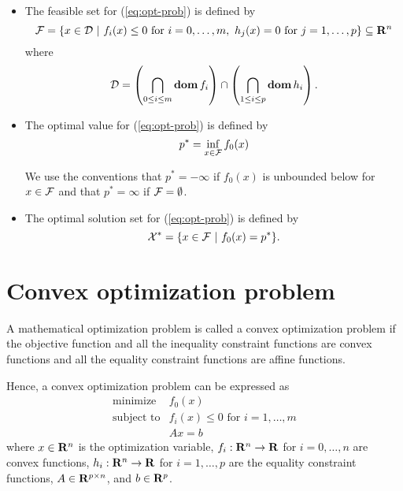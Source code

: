 \begin{itemize}

\item
The feasible set for (\ref{eq:opt-prob}) is defined by
\begin{equation}
\mathcal{F}
=
\{x\in \mathcal{D}~|~ f_i(x)\leq 0 \mbox{ for } i =0, \ldots, m,\ h_j(x) = 0 \mbox{ for } j = 1,\ldots,p\}
\subseteq \mathbf{R}^n
\end{equation}
where
\begin{equation}
\mathcal{D} = \left( \bigcap_{0\leq i\leq m} \mathop{\bf dom} f_i \right) \cap \left( \bigcap_{1\leq i\leq p} \mathop{\bf dom} h_i \right).
\end{equation}

\item
The optimal value for (\ref{eq:opt-prob}) is defined by
\begin{equation}
p^\ast = \inf_{x\in\mathcal{F}} f_0(x)
\end{equation}

We use the conventions that $p^\ast = -\infty$ if $f_0(x)$ is unbounded below for $x\in \mathcal{F}$
and that $p^\ast = \infty$ if $\mathcal{F} = \emptyset$.

\item
The optimal solution set for (\ref{eq:opt-prob}) is defined by
\begin{equation}
\mathcal{X}^\ast = \{x\in\mathcal{F}~|~f_0(x) = p^\ast\}.
\end{equation}


\end{itemize}


\section{Convex optimization problem}

A mathematical optimization problem is called a convex optimization problem
if the objective function and all the inequality constraint functions are convex functions
and all the equality constraint functions are affine functions.

Hence, a convex optimization problem can be expressed as
\begin{equation}
\label{eq:cvx-opt-prob}
\begin{array}{ll}
\mbox{minimize} & f_0(x)
\\
\mbox{subject to} & f_i(x) \leq 0 \mbox{ for } i = 1, \ldots, m
\\
& A x = b
\end{array}
\end{equation}
where
$x\in\mathbf{R}^n$ is the optimization variable,
$f_i:\mathbf{R}^n\to\mathbf{R}$ for $i=0,\ldots,n$ are convex functions,
$h_i:\mathbf{R}^n\to\mathbf{R}$ for $i=1,\ldots,p$ are the equality constraint functions,
$A \in \mathbf{R}^{p\times n}$, and $b\in\mathbf{R}^p$.


